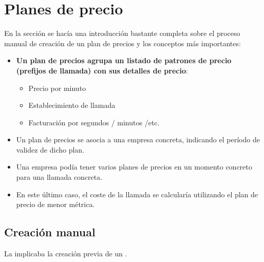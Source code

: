 \documentclass[letterpaper,10pt,spanish]{sphinxmanual}
\begin{document}
\section{Planes de precio}
\label{billing_and_invoices/pricing_plans:planes-de-precio}\label{billing_and_invoices/pricing_plans::doc}
En la sección {\hyperref[external_outgoing_calls/noplan_nocall:noplan\string-nocall]{}} se hacía una introducción bastante completa sobre el proceso manual de creación de un plan de precios y los conceptos más importantes:
\begin{itemize}
\item {} 
\textbf{Un plan de precios agrupa un listado de patrones de precio (prefijos de llamada) con sus detalles de precio}:
\begin{itemize}
\item {} 
Precio por minuto

\item {} 
Establecimiento de llamada

\item {} 
Facturación por segundos / minutos /etc.

\end{itemize}

\item {} 
Un plan de precios se asocia a una empresa concreta, indicando el período de validez de dicho plan.

\item {} 
Una empresa podía tener varios planes de precios en un momento concreto para una llamada concreta.

\item {} 
En este último caso, el coste de la llamada se calcularía utilizando el plan de precio de menor métrica.

\end{itemize}


\subsection{Creación manual}
\label{billing_and_invoices/pricing_plans:creacion-manual}
La {\hyperref[external_outgoing_calls/noplan_nocall:price\string-plan]{}} implicaba la creación previa de un {\hyperref[external_outgoing_calls/noplan_nocall:price\string-pattern]{}}.
\end{document}

